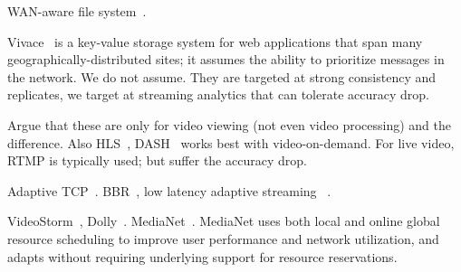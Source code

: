 WAN-aware file system~\cite{muthitacharoen2001low}.

Vivace~\cite{cho2012surviving} is a key-value storage system for web
applications that span many geographically-distributed sites; it assumes the
ability to prioritize messages in the network. We do not assume. They are
targeted at strong consistency and replicates, we target at streaming analytics
that can tolerate accuracy drop.

 Argue that these are only for video viewing (not even
video processing) and the difference. Also HLS~\cite{pantos2016http},
DASH~\cite{michalos2012dynamic} works best with video-on-demand. For live video,
RTMP is typically used; but suffer the accuracy drop.

Adaptive TCP~\cite{wu2013adaptive}. BBR~\cite{cardwell2017bbr}, low latency
adaptive streaming ~\cite{goel2008low}.

 VideoStorm~\cite{zhang2017live},
Dolly~\cite{ananthanarayanan2013effective}.
MediaNet~\cite{hicks2003user}. MediaNet uses both local and online global
resource scheduling to improve user performance and network utilization, and
adapts without requiring underlying support for resource reservations.


